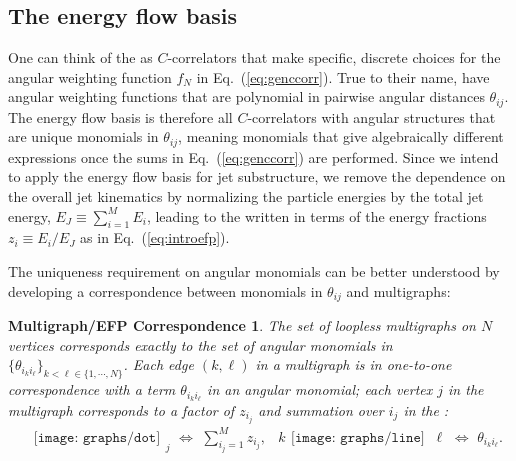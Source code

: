 \documentclass[letterpaper,11pt]{article}
\DeclareRobustCommand{\Eq}[1]{Eq.~(\ref{#1})}
\newcommand{\B}{\text{EFP}\xspace}
\newcommand{\Bs}{\text{EFPs}\xspace}
\newtheorem*{EFPMultiCorre}{Multigraph/EFP Correspondence}
\begin{document}
\subsection{The energy flow basis}
\label{sec:efbasis}

One can think of the \Bs as $C$-correlators that make specific, discrete choices for the angular weighting function $f_N$ in \Eq{eq:genccorr}.  
%
True to their name, \Bs have angular weighting functions that are polynomial in pairwise angular distances $\theta_{ij}$.
%
The energy flow basis is therefore all $C$-correlators with angular structures that are unique monomials in $\theta_{ij}$, meaning monomials that give algebraically different expressions once the sums in \Eq{eq:genccorr} are performed.
%
Since we intend to apply the energy flow basis for jet substructure, we remove the dependence on the overall jet kinematics by normalizing the particle energies by the total jet energy, $E_J\equiv\sum_{i=1}^M E_i$, leading to the \Bs written in terms of the energy fractions $z_i\equiv E_i/E_{J}$ as in \Eq{eq:introefp}. 

The uniqueness requirement on angular monomials can be better understood by developing a correspondence between monomials in $\theta_{ij}$ and multigraphs:
%
\begin{EFPMultiCorre}
The set of loopless multigraphs on $N$ vertices corresponds exactly to the set of angular monomials in $\{\theta_{i_k i_\ell}\}_{k<\ell\in\{1,\cdots,N\}}$. Each edge $(k,\ell)$ in a multigraph is in one-to-one correspondence with a term $\theta_{i_ki_\ell}$ in an angular monomial; each vertex $j$ in the multigraph corresponds to a factor of $z_{i_j}$ and summation over $i_j$ in the \B:
\begin{align}\label{eq:correspondence}
&\begin{gathered}
\texttt{[image: graphs/dot]}
\end{gathered}_j
 \,\,\Longleftrightarrow\,\, \sum_{i_j=1}^Mz_{i_j},
& k \begin{gathered}
\texttt{[image: graphs/line]}
\end{gathered} \,\ell
 \,\,\Longleftrightarrow\,\, \theta_{i_ki_\ell}.
\end{align}
\end{EFPMultiCorre}
\end{document}
